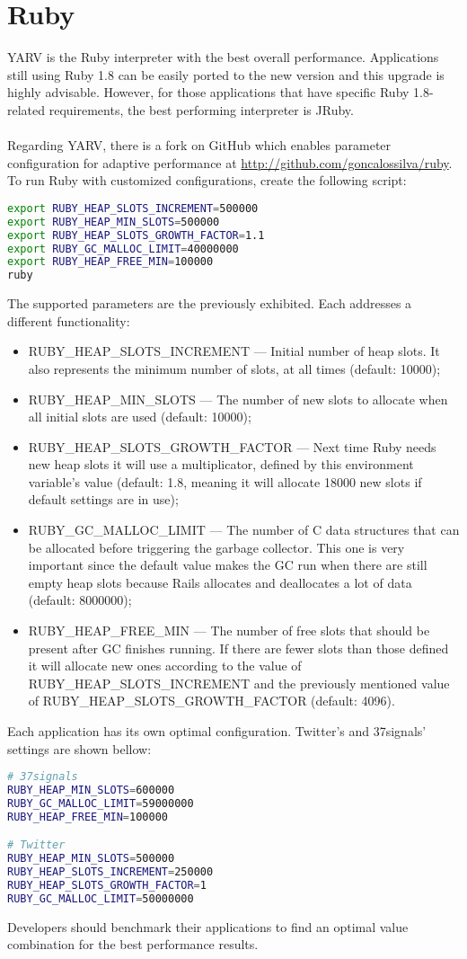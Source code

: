 \section{Ruby}
YARV is the Ruby interpreter with the best overall performance. Applications still using Ruby 1.8 can be easily ported to the new version and this upgrade is highly advisable. However, for those applications that have specific Ruby 1.8-related requirements, the best performing interpreter is JRuby.\\\\
Regarding YARV, there is a fork on GitHub which enables parameter configuration for adaptive performance at \url{http://github.com/goncalossilva/ruby}. To run Ruby with customized configurations, create the following script:
\begin{lstlisting}[language=bash]
export RUBY_HEAP_SLOTS_INCREMENT=500000
export RUBY_HEAP_MIN_SLOTS=500000
export RUBY_HEAP_SLOTS_GROWTH_FACTOR=1.1
export RUBY_GC_MALLOC_LIMIT=40000000
export RUBY_HEAP_FREE_MIN=100000
ruby
\end{lstlisting}
The supported parameters are the previously exhibited. Each addresses a different functionality:
\begin{itemize}
  \item RUBY\_HEAP\_SLOTS\_INCREMENT --- Initial number of heap slots. It also represents the minimum number of slots, at all times (default: 10000);
  \item RUBY\_HEAP\_MIN\_SLOTS --- The number of new slots to allocate when all initial slots are used (default: 10000);
  \item RUBY\_HEAP\_SLOTS\_GROWTH\_FACTOR --- Next time Ruby needs new heap slots it will use a multiplicator, defined by this environment variable’s value (default: 1.8, meaning it will allocate 18000 new slots if default settings are in use);
  \item RUBY\_GC\_MALLOC\_LIMIT --- The number of C data structures that can be allocated before triggering the garbage collector. This one is very important since the default value makes the GC run when there are still empty heap slots because Rails allocates and deallocates a lot of data (default: 8000000);
  \item RUBY\_HEAP\_FREE\_MIN --- The number of free slots that should be present after GC finishes running. If there are fewer slots than those defined it will allocate new ones according to the value of RUBY\_HEAP\_SLOTS\_INCREMENT and the previously mentioned value of RUBY\_HEAP\_SLOTS\_GROWTH\_FACTOR (default: 4096).
\end{itemize}
Each application has its own optimal configuration. Twitter's and 37signals' settings are shown bellow:
\begin{lstlisting}[language=bash]
# 37signals
RUBY_HEAP_MIN_SLOTS=600000
RUBY_GC_MALLOC_LIMIT=59000000
RUBY_HEAP_FREE_MIN=100000

# Twitter
RUBY_HEAP_MIN_SLOTS=500000
RUBY_HEAP_SLOTS_INCREMENT=250000
RUBY_HEAP_SLOTS_GROWTH_FACTOR=1
RUBY_GC_MALLOC_LIMIT=50000000
\end{lstlisting}
Developers should benchmark their applications to find an optimal value combination for the best performance results.

